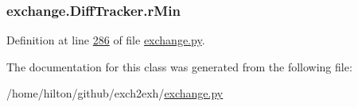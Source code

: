 \subsubsection[{\texorpdfstring{r\+Min}{rMin}}]{\setlength{\rightskip}{0pt plus 5cm}exchange.\+Diff\+Tracker.\+r\+Min}\hypertarget{classexchange_1_1_diff_tracker_ad3250cb94933244444942dec9199d362}{}\label{classexchange_1_1_diff_tracker_ad3250cb94933244444942dec9199d362}


Definition at line \hyperlink{exchange_8py_source_l00286}{286} of file \hyperlink{exchange_8py_source}{exchange.\+py}.



The documentation for this class was generated from the following file\+:\begin{DoxyCompactItemize}
\item 
/home/hilton/github/exch2exh/\hyperlink{exchange_8py}{exchange.\+py}\end{DoxyCompactItemize}
